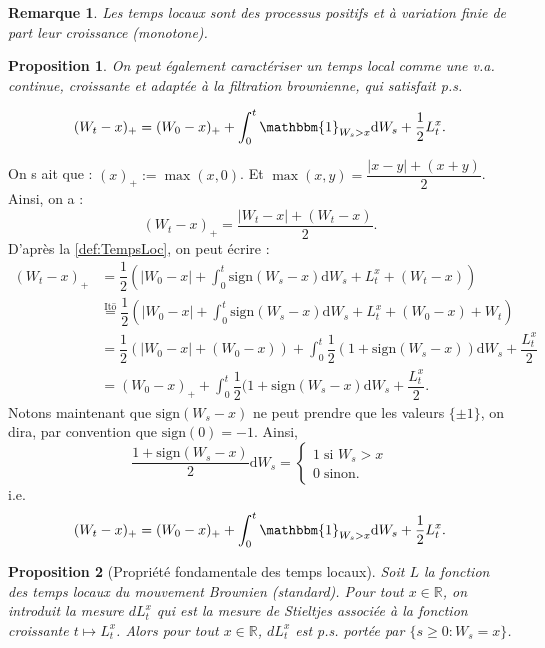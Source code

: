 \documentclass[openany]{book}
\makeatletter
\newcommand{\R}{\mathbb{R}}
\newcommand{\1}{\mathbbm{1}}
\newcommand{\sign}{\text{sign}}
\renewcommand{\d}{\mathrm{d}}
\renewenvironment{proof}[1][\textbf{\textit{Démonstration}}]{%
  \par\pushQED{\qed}%
  \normalfont\topsep6\p@\@plus6\p@\relax
  \trivlist\item[\hskip\labelsep
    #1\@addpunct{.}]\ignorespaces
}{%
  \popQED\endtrivlist\@endpefalse
}
\theoremstyle{thmfont}
\theoremstyle{deffont}
\theoremstyle{thmfont}
\newtheorem{prop}[prop]{Proposition}
\theoremstyle{deffont}
\newtheorem{remark}[remark]{Remarque}
\makeatother
\begin{document}
\begin{remark}
Les temps locaux sont des processus \textit{positifs} et à \textit{variation finie} de part leur croissance (monotone).
\end{remark}

\begin{prop}
  On peut également caractériser un \textit{temps local} comme une v.a. continue, croissante et adaptée à la filtration brownienne, qui satisfait p.s.

  \begin{equation}
    (W_t - x)_+ = (W_0 - x)_+ + \int_0^t \1_{W_s > x}\d W_s + \dfrac{1}{2}L_t^x.
  \end{equation}
\end{prop}

\begin{proof}
  On s
  ait que : $(x)_+ := \max(x, 0)$. Et $\max(x,y) = \dfrac{|x-y| + (x+y)}{2}$.
  Ainsi, on a : $$(W_t - x)_+ = \dfrac{|W_t - x| + (W_t - x)}{2}.$$
  D'après la \autoref{def:TempsLoc}, on peut écrire :
  \begin{align*}
    (W_t - x)_+ &= \dfrac{1}{2}\left(|W_0 - x| + \int_0^t\sign(W_s - x)\d W_s + L_t^x + (W_t - x)\right)\\
    &\overset{\text{Itō}}{=} \dfrac{1}{2} \left(|W_0 - x| + \int_0^t\sign(W_s - x)\d W_s + L_t^x + (W_0 - x) + W_t \right)\\
    &= \dfrac{1}{2} \left(|W_0 - x| + (W_0 - x) \right) + \int_0^t\dfrac{1}{2}(1 + \sign(W_s - x))\d W_s + \dfrac{L_t^x}{2}\\
    &= (W_0 - x)_+ + \int_0^t\dfrac{1}{2}(1 + \sign(W_s - x) \d W_s + \dfrac{L_t^x}{2}.
  \end{align*}
  Notons maintenant que $\sign(W_s - x)$ ne peut prendre que les valeurs $\{\pm 1\}$, on dira, par convention que $\sign(0) = -1$. Ainsi,
  $$ \dfrac{1 + \sign(W_s - x)}{2}\d W_s =
  \begin{cases} 1\; \text{si } W_s > x\\
                0 \; \text{sinon.}
  \end{cases}
  $$
 i.e.
 $$(W_t - x)_+ = (W_0 - x)_+ + \int_0^t\1_{W_s > x} \d W_s + \frac{1}{2}L_t^x.$$
  
\end{proof}

\begin{prop}[Propriété fondamentale des temps locaux]
Soit $L$ la fonction des temps locaux du mouvement Brownien (standard). Pour tout $x \in \R$, on introduit la mesure $dL^x_t$ qui est la mesure de Stieltjes associée à la fonction croissante $t \mapsto L_t^x$. Alors pour tout $x\in \R$, $dL^x_t$ est p.s. portée par $\{s \geq 0 : W_s = x\}$.
\end{prop}
\end{document}
